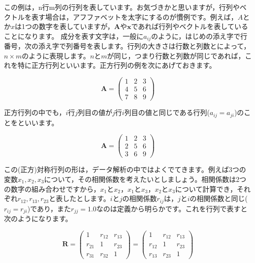 \documentclass{ltjsbook}
\begin{document}
この例は，n行m列の行列を表しています。お気づきかと思いますが，行列やベクトルを表す場合は，アフファベットを太字にするのが慣例です。例えば，$A$とか$x$は1つの数字を表していますが，$\bm{A}$や$\bm{x}$であれば行列やベクトルを表していることになります。
成分を表す文字は，一般に$a_{ij}$のように，はじめの添え字で行番号，次の添え字で列番号を表します。行列の大きさは行数と列数とによって，$n \times m$のように表現します。$n$と$m$が同じ，つまり行数と列数が同じであれば，これを特に正方行列といいます。正方行列の例を次にあげておきます。


\begin{equation*}
    \bm{A} = 
    \begin{pmatrix}
        1 & 2 & 3 \\
        4 & 5 & 6 \\
        7 & 8 & 9
    \end{pmatrix}
\end{equation*}

正方行列の中でも，$i$行$j$列目の値が$j$行$i$列目の値と同じである行列($a_{ij}=a_{ji}$)のことをといいます。

\begin{equation*}
    \bm{A} = 
    \begin{pmatrix}
        1 & 2 & 3 \\
        2 & 5 & 6 \\
        3 & 6 & 9
    \end{pmatrix}
\end{equation*}

この(正方)対称行列の形は，データ解析の中ではよくでてきます。例えば3つの変数$x_1,x_2,x_3$について，その相関係数を考えたいとしましょう。相関係数は2つの数字の組み合わせですから，$x_1$と$x_2$，$x_1$と$x_3$，$x_2$と$x_3$について計算でき，それぞれ$r_{12},r_{13},r_{23}$と表したとします。$i$と$j$の相関係数$r_{ij}$は，$j$と$i$の相関係数と同じ($r_{ij}=r_{ji}$)であり，また$r_{jj}=1.0$なのは定義から明らかです。これを行列で表すと次のようになります。

\begin{equation*}
    \bm{R} = 
    \begin{pmatrix}
        1 & r_{12} & r_{13} \\
        r_{21} & 1 & r_{23} \\
        r_{31} & r_{32} & 1
    \end{pmatrix}=
    \begin{pmatrix}
        1 & r_{12} & r_{13} \\
        r_{12} & 1 & r_{23} \\
        r_{13} & r_{23} & 1
    \end{pmatrix}
\end{equation*}
\end{document}
